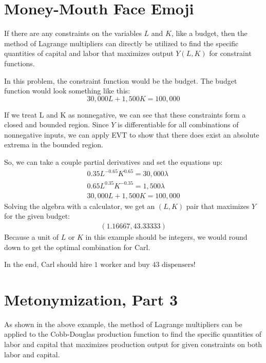\chapter{Money-Mouth Face Emoji}
If there are any constraints on the variables $L$ and $K$, like a budget, then the method of Lagrange multipliers can directly be utilized to find the specific quantities of capital and labor that maximizes output $Y(L, K)$ for constraint functions.

In this problem, the constraint function would be the budget.
The budget function would look something like this:
\begin{equation}
	30,000L + 1,500K = 100,000%
\end{equation}

If we treat L and K as nonnegative, we can see that these constraints form a closed and bounded region.
Since $Y$ is differentiable for all combinations of nonnegative inputs, we can apply EVT to show that there does exist an absolute extrema in the bounded region.

So, we can take a couple partial derivatives and set the equations up:
\begin{align*}
	0.35L^{-0.65}K^{0.65} = 30,000\lambda\\
	0.65L^{0.35}K^{-0.35} = 1,500\lambda\\
	30,000L + 1,500K = 100,000
\end{align*}
Solving the algebra with a calculator, we get an $(L, K)$ pair that maximizes $Y$ for the given budget:
\begin{align*}
	\left(1.16667, 43.33333\right)
\end{align*}
Because a unit of $L$ or $K$ in this example should be integers, we would round down to get the optimal combination for Carl.

In the end, Carl should $\boxed{\text{hire }1\text{ worker and buy }43\text{ dispensers}}$!%
\setcounter{chapter}{10}
\chapter{Metonymization, Part 3}
As shown in the above example, the method of Lagrange multipliers can be applied to the Cobb-Douglas production function to find the specific quantities of labor and capital that maximizes production output for given constraints on both labor and capital.

